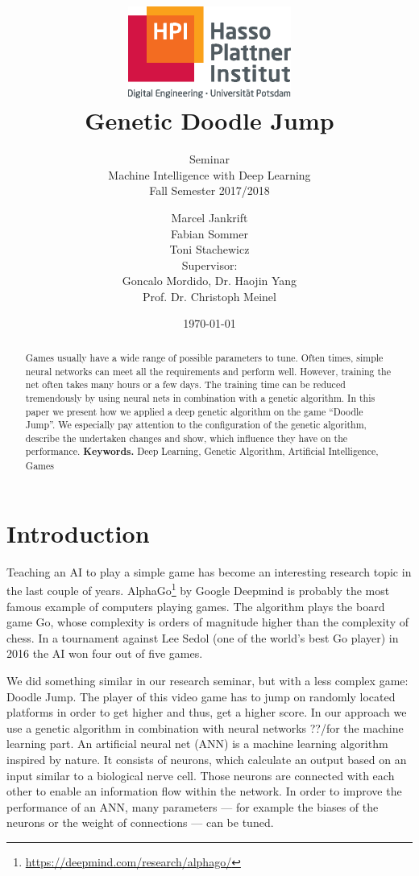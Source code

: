 \documentclass[a4paper,12pt,pagesize,headsepline,bibtotoc,titlepage,abstracton]{scrartcl}
\title{
	\includegraphics*[width=0.4\textwidth]{hpi_logo_2017.eps}\\
	\vspace{24pt}
	Genetic Doodle Jump
}
\subtitle{
	Seminar\\
	Machine Intelligence with Deep Learning\\
	Fall Semester 2017/2018
}
\author{
	Marcel Jankrift\\
	Fabian Sommer\\
	Toni Stachewicz\\[12pt]
	Supervisor:\\
	Goncalo Mordido,
	Dr. Haojin Yang\\
	Prof. Dr. Christoph Meinel
}
\date{\today}
\newcommand{\quot}[1]{{``#1''}}
\begin{document}
\maketitle
\tableofcontents

\newpage

\begin{abstract}
Games usually have a wide range of possible parameters to tune. Often times, simple neural networks can meet all the requirements and perform well. However, training the net often takes many hours or a few days. The training time can be reduced tremendously by using neural nets in combination with a genetic algorithm. In this paper we present how we applied a deep genetic algorithm on the game \quot{Doodle Jump}. We especially pay attention to the configuration of the genetic algorithm, describe the undertaken changes and show, which influence they have on the performance.
\vskip 0.7cm
\noindent \textbf{Keywords.} Deep Learning, Genetic Algorithm, Artificial Intelligence, Games
\end{abstract}
\newpage

\section{Introduction}
Teaching an AI to play a simple game has become an interesting research topic in the last couple of years. AlphaGo\footnote{\url{https://deepmind.com/research/alphago/}} by Google Deepmind is probably the most famous example of computers playing games. The algorithm plays the board game Go, whose complexity is orders of magnitude higher than the complexity of chess. In a tournament against Lee Sedol (one of the world's best Go player) in 2016 the AI won four out of five games.

We did something similar in our research seminar, but with a less complex game: Doodle Jump. The player of this video game has to jump on randomly located platforms in order to get higher and thus, get a higher score. In our approach we use a genetic algorithm in combination with neural networks ??/for the machine learning part. An artificial neural net (ANN) is a machine learning algorithm inspired by nature. It consists of neurons, which calculate an output based on an input similar to a biological nerve cell. Those neurons are connected with each other to enable an information flow within the network. In order to improve the performance of an ANN, many parameters --- for example the biases of the neurons or the weight of connections --- can be tuned.
\end{document}
